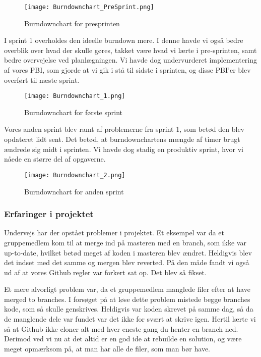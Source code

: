 \begin{figure}[h]
    \caption{Burndownchart for presprinten}
    \centering
        \texttt{[image: Burndownchart\_PreSprint.png]}
    \label{burndownpresprint}
\end{figure}

I sprint 1 overholdes den ideelle burndown mere.
I denne havde vi også bedre overblik over hvad der skulle gøres, takket være hvad vi lærte i pre-sprinten, samt bedre overvejelse ved planlægningen.
Vi havde dog undervurderet implementering af vores PBI, som gjorde at vi gik i stå til sidste i sprinten, og disse PBI'er blev overført til næste sprint.

\begin{figure}[h]
    \caption{Burndownchart for første sprint}
    \centering
        \texttt{[image: Burndownchart\_1.png]}
    \label{burndownfirstsprint}
\end{figure}

Vores anden sprint blev ramt af problemerne fra sprint 1, som betød den blev opdateret lidt sent.
Det betød, at burndownchartens mængde af timer brugt ændrede sig midt i sprinten.
Vi havde dog stadig en produktiv sprint, hvor vi nåede en større del af opgaverne.

\begin{figure}[h]
    \caption{Burndownchart for anden sprint}
    \centering
        \texttt{[image: Burndownchart\_2.png]}
    \label{burndownsecondsprint}
\end{figure}

\subsubsection{Erfaringer i projektet}

Undervejs har der opstået problemer i projektet.
Et eksempel var da et gruppemedlem kom til at merge ind på masteren med en branch, som ikke var up-to-date, hvilket betød meget af koden i masteren blev ændret.
Heldigvis blev det indset med det samme og mergen blev reverted.
På den måde fandt vi også ud af at vores Github regler var forkert sat op.
Det blev så fikset.

Et mere alvorligt problem var, da et gruppemedlem manglede filer efter at have merged to branches.
I forsøget på at løse dette problem mistede begge branches kode, som så skulle genskrives.
Heldigvis var koden skrevet på samme dag, så da de manglende dele var fundet var det ikke for svært at skrive igen.
Hertil lærte vi så at Github ikke cloner alt med hver eneste gang du henter en branch ned.
Derimod ved vi nu at det altid er en god ide at rebuilde en solution, og være meget opmærksom på, at man har alle de filer, som man bør have.